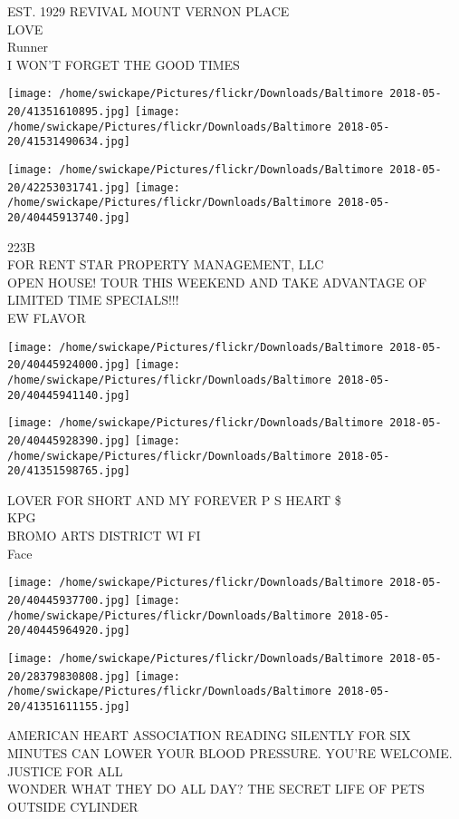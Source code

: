 \documentclass[10pt,letterpaper]{article}
\begin{document}
EST. 1929 REVIVAL MOUNT VERNON PLACE\\
LOVE\\
Runner\\
I WON'T FORGET THE GOOD TIMES
\pagebreak

\texttt{[image: /home/swickape/Pictures/flickr/Downloads/Baltimore 2018-05-20/41351610895.jpg]}
\texttt{[image: /home/swickape/Pictures/flickr/Downloads/Baltimore 2018-05-20/41531490634.jpg]}

\texttt{[image: /home/swickape/Pictures/flickr/Downloads/Baltimore 2018-05-20/42253031741.jpg]}
\texttt{[image: /home/swickape/Pictures/flickr/Downloads/Baltimore 2018-05-20/40445913740.jpg]}

223B\\
FOR RENT STAR PROPERTY MANAGEMENT, LLC\\
OPEN HOUSE!  TOUR THIS WEEKEND AND TAKE ADVANTAGE OF LIMITED TIME SPECIALS!!!\\
EW FLAVOR
\pagebreak

\texttt{[image: /home/swickape/Pictures/flickr/Downloads/Baltimore 2018-05-20/40445924000.jpg]}
\texttt{[image: /home/swickape/Pictures/flickr/Downloads/Baltimore 2018-05-20/40445941140.jpg]}

\texttt{[image: /home/swickape/Pictures/flickr/Downloads/Baltimore 2018-05-20/40445928390.jpg]}
\texttt{[image: /home/swickape/Pictures/flickr/Downloads/Baltimore 2018-05-20/41351598765.jpg]}

LOVER FOR SHORT AND MY FOREVER P S HEART \$\\
KPG\\
BROMO ARTS DISTRICT WI FI\\
Face
\pagebreak

\texttt{[image: /home/swickape/Pictures/flickr/Downloads/Baltimore 2018-05-20/40445937700.jpg]}
\texttt{[image: /home/swickape/Pictures/flickr/Downloads/Baltimore 2018-05-20/40445964920.jpg]}

\texttt{[image: /home/swickape/Pictures/flickr/Downloads/Baltimore 2018-05-20/28379830808.jpg]}
\texttt{[image: /home/swickape/Pictures/flickr/Downloads/Baltimore 2018-05-20/41351611155.jpg]}

AMERICAN HEART ASSOCIATION READING SILENTLY FOR SIX MINUTES CAN LOWER YOUR BLOOD PRESSURE.  YOU'RE WELCOME.\\
JUSTICE FOR ALL\\
WONDER WHAT THEY DO ALL DAY?  THE SECRET LIFE OF PETS\\
OUTSIDE CYLINDER
\pagebreak
\end{document}
